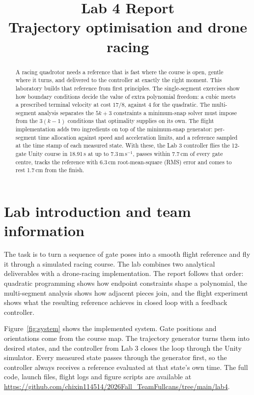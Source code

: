 \documentclass[12pt,a4paper,twoside]{article}
\title{Lab 4 Report\\[0.3em]\large Trajectory optimisation and drone racing}
\author{\studentname}
\date{}
\renewcommand{\abstractname}{Summary}
\begin{document}
\raggedbottom
\renewcommand{\abstractname}{Summary}
\maketitle
\begin{abstract}
A racing quadrotor needs a reference that is fast where the course is open,
gentle where it turns, and delivered to the controller at exactly the right
moment. This laboratory builds that reference from first principles. The
single-segment exercises show how boundary conditions decide the value of extra
polynomial freedom: a cubic meets a prescribed terminal velocity at cost $17/8$,
against 4 for the quadratic. The multi-segment analysis separates the $5k+3$
constraints a minimum-snap solver must impose from the $3(k-1)$ conditions that
optimality supplies on its own. The flight implementation adds two ingredients
on top of the minimum-snap generator: per-segment time allocation against
speed and acceleration limits, and a reference sampled at the time stamp of each
measured state. With these, the Lab 3 controller flies the 12-gate Unity course
in 18.91\,s at up to 7.3\,m\,s$^{-1}$, passes within 7.7\,cm of every gate centre,
tracks the reference with 6.3\,cm root-mean-square (RMS) error and comes to rest
1.7\,cm from the finish.
\end{abstract}

\section{Lab introduction and team information}
The task is to turn a sequence of gate poses into a smooth flight reference and
fly it through a simulated racing course. The lab combines two analytical
deliverables with a drone-racing implementation\cite{lab4}. The report follows
that order: quadratic programming shows how endpoint constraints shape a
polynomial, the multi-segment analysis shows how adjacent pieces join, and the
flight experiment shows what the resulting reference achieves in closed loop
with a feedback controller.

Figure~\ref{fig:system} shows the implemented system. Gate positions and
orientations come from the course map. The trajectory generator turns them into
desired states, and the controller from Lab 3 closes the loop through the Unity
simulator. Every measured state passes through the generator first, so the
controller always receives a reference evaluated at that state's own time.
The full code, launch files, flight logs and figure scripts are available at
\url{https://github.com/chixin114514/2026Fall_TeamFullcans/tree/main/lab4}.
\end{document}
